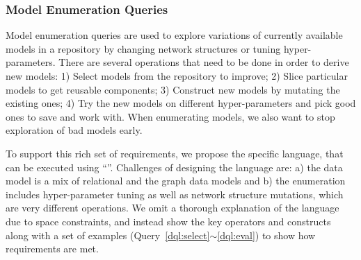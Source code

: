 \documentclass[conference]{IEEEtran}
\begin{document}
\subsubsection{Model Enumeration Queries}
\label{subsec:dql}
Model enumeration queries are used to explore variations of currently available models in a
repository by changing network structures or tuning hyper-parameters.
There are several operations that need to be done in order to derive new models: 1) Select
models from the repository to improve; 2) Slice particular models to get reusable components; 3)
Construct new models by mutating the existing ones; 4) Try the new models on different
hyper-parameters and pick good ones to save and work with. When enumerating models, we also want to
stop exploration of bad models early.


To support this rich set of requirements, %
we propose the \DQL\domain specific language, that can be executed using ``''. Challenges of designing the language are: a) the data model is a mix of relational and the graph data models and b) the enumeration includes hyper-parameter tuning as well as network structure mutations, which are very different operations. We omit a thorough explanation of the language due to space constraints, and instead show the key operators and constructs along with a set of examples (Query~\ref{dql:select}$\sim$\ref{dql:eval}) to show how requirements are met.
\end{document}
